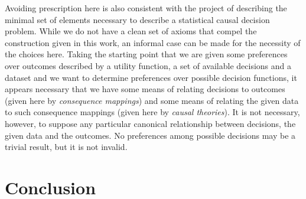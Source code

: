 Avoiding prescription here is also consistent with the project of describing the minimal set of elements necessary to describe a statistical causal decision problem. While we do not have a clean set of axioms that compel the construction given in this work, an informal case can be made for the necessity of the choices here. Taking the starting point that we are given some preferences over outcomes described by a utility function, a set of available decisions and a dataset and we want to determine preferences over possible decision functions, it appears necessary that we have some means of relating decisions to outcomes (given here by \emph{consequence mappings}) and some means of relating the given data to such consequence mappings (given here by \emph{causal theories}). It is not necessary, however, to suppose any particular canonical relationship between decisions, the given data and the outcomes. No preferences among possible decisions may be a trivial result, but it is not invalid.



\section{Conclusion}